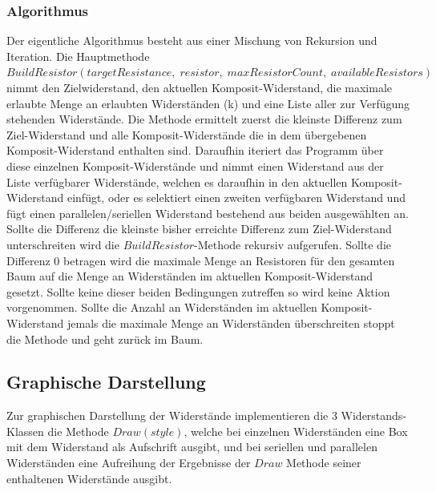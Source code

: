 \documentclass{article}
\begin{document}
\subsubsection{Algorithmus}
Der eigentliche Algorithmus besteht aus einer Mischung von Rekursion und Iteration.
Die Hauptmethode $BuildResistor(targetResistance,\;resistor,\;maxResistorCount,\;availableResistors)$ nimmt den Zielwiderstand, den aktuellen Komposit-Widerstand, die maximale erlaubte Menge an erlaubten Widerständen (k) und eine Liste aller zur Verfügung stehenden Widerstände. Die Methode ermittelt zuerst die kleinste Differenz zum Ziel-Widerstand und alle Komposit-Widerstände die in dem übergebenen Komposit-Widerstand enthalten sind.
Daraufhin iteriert das Programm über diese einzelnen Komposit-Widerstände und nimmt einen Widerstand aus der Liste verfügbarer Widerstände, welchen es daraufhin in den aktuellen Komposit-Widerstand einfügt, oder es selektiert einen zweiten verfügbaren Widerstand und fügt einen parallelen/seriellen Widerstand bestehend aus beiden ausgewählten an. Sollte die Differenz die kleinste bisher erreichte Differenz zum Ziel-Widerstand unterschreiten wird die $BuildResistor$-Methode rekursiv aufgerufen. Sollte die Differenz 0 betragen wird die maximale Menge an Resistoren für den gesamten Baum auf die Menge an Widerständen im aktuellen Komposit-Widerstand gesetzt. Sollte keine dieser beiden Bedingungen zutreffen so wird keine Aktion vorgenommen.
Sollte die Anzahl an Widerständen im aktuellen Komposit-Widerstand jemals die maximale Menge an Widerständen überschreiten stoppt die Methode und geht zurück im Baum.

\subsection{Graphische Darstellung}
Zur graphischen Darstellung der Widerstände implementieren die 3 Widerstands-Klassen die Methode $Draw(style)$, welche bei einzelnen Widerständen eine Box mit dem Widerstand als Aufschrift ausgibt, und bei seriellen und parallelen Widerständen eine Aufreihung der Ergebnisse der $Draw$ Methode seiner enthaltenen Widerstände ausgibt.

\newpage
\end{document}

